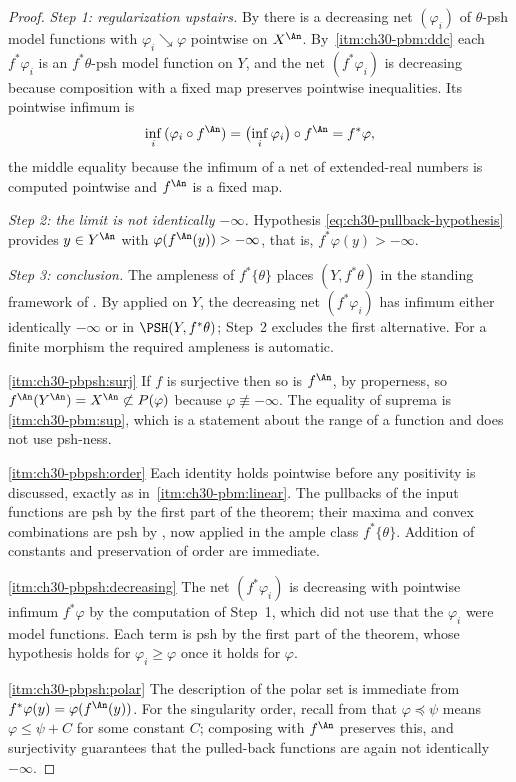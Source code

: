 \begin{proof}
\emph{Step 1: regularization upstairs.}  By
 there is a decreasing net
\((\varphi_i)\) of \(\theta\)-psh model functions with
\(\varphi_i\searrow\varphi\) pointwise on \(X^{\An}\).  By
\,\cref{itm:ch30-pbm:ddc} each
\(f^*\varphi_i\) is an \(f^*\theta\)-psh model function on \(Y\), and the
net \((f^*\varphi_i)\) is decreasing because composition with a fixed map
preserves pointwise inequalities.  Its pointwise infimum is
\[
 \inf_i\,(\varphi_i\circ f^{\An})
 =\bigl(\inf_i\varphi_i\bigr)\circ f^{\An}
 =f^*\varphi,
\]
the middle equality because the infimum of a net of extended-real numbers is
computed pointwise and \(f^{\An}\) is a fixed map.

\emph{Step 2: the limit is not identically \(-\infty\).}  Hypothesis
\eqref{eq:ch30-pullback-hypothesis} provides \(y\in Y^{\An}\) with
\(\varphi(f^{\An}(y))>-\infty\), that is, \(f^*\varphi(y)>-\infty\).

\emph{Step 3: conclusion.}  The ampleness of \(f^*\{\theta\}\) places
\((Y,f^*\theta)\) in the standing framework of .
By  applied on \(Y\), the decreasing net
\((f^*\varphi_i)\) has infimum either identically \(-\infty\) or in
\(\PSH(Y,f^*\theta)\); Step~2 excludes the first alternative.  For a finite
morphism the required ampleness is automatic.

\cref{itm:ch30-pbpsh:surj}  If \(f\) is surjective then so is \(f^{\An}\), by
properness, so \(f^{\An}(Y^{\An})=X^{\An}\not\subset P(\varphi)\) because
\(\varphi\not\equiv-\infty\).  The equality of suprema is
\,\cref{itm:ch30-pbm:sup}, which is a
statement about the range of a function and does not use psh-ness.

\cref{itm:ch30-pbpsh:order}  Each identity holds pointwise before any
positivity is discussed, exactly as in
\,\cref{itm:ch30-pbm:linear}.  The
pullbacks of the input functions are psh by the first part of the theorem;
their maxima and convex combinations are psh by
, now applied in the ample class
\(f^*\{\theta\}\).  Addition of constants and preservation of order are
immediate.

\cref{itm:ch30-pbpsh:decreasing}  The net \((f^*\varphi_i)\) is decreasing
with pointwise infimum \(f^*\varphi\) by the computation of Step~1, which
did not use that the \(\varphi_i\) were model functions.  Each term is psh
by the first part of the theorem, whose hypothesis holds for
\(\varphi_i\geq\varphi\) once it holds for \(\varphi\).

\cref{itm:ch30-pbpsh:polar}  The description of the polar set is immediate
from \(f^*\varphi(y)=\varphi(f^{\An}(y))\).  For the singularity order,
recall from  that \(\varphi\preceq\psi\)
means \(\varphi\leq\psi+C\) for some constant \(C\); composing with
\(f^{\An}\) preserves this, and surjectivity guarantees that the pulled-back
functions are again not identically \(-\infty\).
\end{proof}

